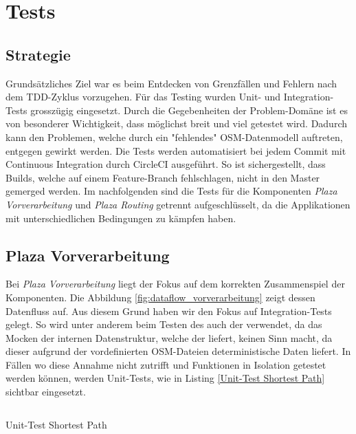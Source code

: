 
\section{Tests}
\label{sec:Tests}

\subsection{Strategie}
\label{test:Strategie}
Grundsätzliches Ziel war es beim Entdecken von Grenzfällen und Fehlern nach dem \ac{TDD}-Zyklus vorzugehen. Für das Testing wurden Unit- und Integration-Tests grosszügig eingesetzt. Durch die Gegebenheiten der Problem-Domäne ist es von besonderer Wichtigkeit, dass möglichst breit und viel getestet wird. Dadurch kann den Problemen, welche durch ein "fehlendes" \ac{OSM}-Datenmodell auftreten, entgegen gewirkt werden.  Die Tests werden automatisiert bei jedem Commit mit Continuous Integration durch CircleCI \cite{circleci} ausgeführt. So ist sichergestellt, dass Builds, welche auf einem Feature-Branch fehlschlagen, nicht in den Master gemerged werden. Im nachfolgenden sind die Tests für die Komponenten \emph{Plaza Vorverarbeitung} und \emph{Plaza Routing} getrennt aufgeschlüsselt, da die Applikationen mit unterschiedlichen Bedingungen zu kämpfen haben. 


\subsection{Plaza Vorverarbeitung}
\label{test:Plaza Vorverarbeitung}
Bei \emph{Plaza Vorverarbeitung} liegt der Fokus auf dem korrekten Zusammenspiel der Komponenten. Die Abbildung \ref{fig:dataflow_vorverarbeitung} zeigt dessen Datenfluss auf. Aus diesem Grund haben wir den Fokus auf Integration-Tests gelegt. So wird unter anderem beim Testen des  auch der  verwendet, da das Mocken der internen Datenstruktur, welche der  liefert, keinen Sinn macht, da dieser aufgrund der vordefinierten \ac{OSM}-Dateien deterministische Daten liefert. In Fällen wo diese Annahme nicht zutrifft und Funktionen in Isolation getestet werden können, werden Unit-Tests, wie in Listing \ref{Unit-Test Shortest Path} sichtbar eingesetzt.

\begin{listing}[ht]
    \inputminted{python}{projectdoc/listing/test_compute_dijkstra_shortest_paths.py}
    \caption{Unit-Test Shortest Path}
    \label{Unit-Test Shortest-Path}
\end{listing}

